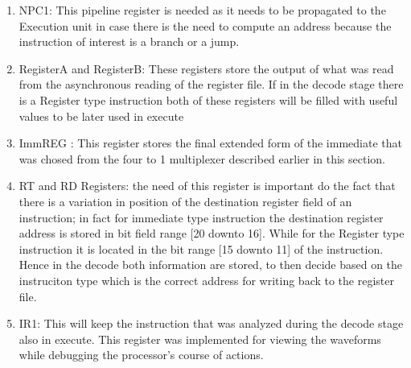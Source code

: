     \begin{enumerate}

        \item NPC1: This pipeline register is needed as it needs to be propagated to the Execution unit in case there is the need to compute an address 
        because the instruction of interest is a branch or a jump.
        \item RegisterA and RegisterB: These registers store the output of what was read from the asynchronous reading of the register file. If in the decode
        stage there is a Register type instruction both of these registers will be filled with useful values to be later used in execute
        \item ImmREG : This register stores the final extended form of the immediate that was chosed from the four to 1 multiplexer described earlier in this section.
        \item RT and RD Registers: the need of this register is important do the fact that there is a variation  in position of the destination register field of an instruction;
        in fact for immediate type instruction the destination register address is stored in bit field range [20 downto 16]. While for the Register type instruction it is located
        in the bit range [15 downto 11] of the instruction. Hence in the decode both information are stored, to then decide based on the instruciton type which is the correct address
        for writing back to the register file.
        \item IR1: This will keep the instruction that was analyzed during the decode stage also in execute. This register was implemented for viewing the waveforms
        while debugging the processor's course of actions.



        \end{enumerate}
    